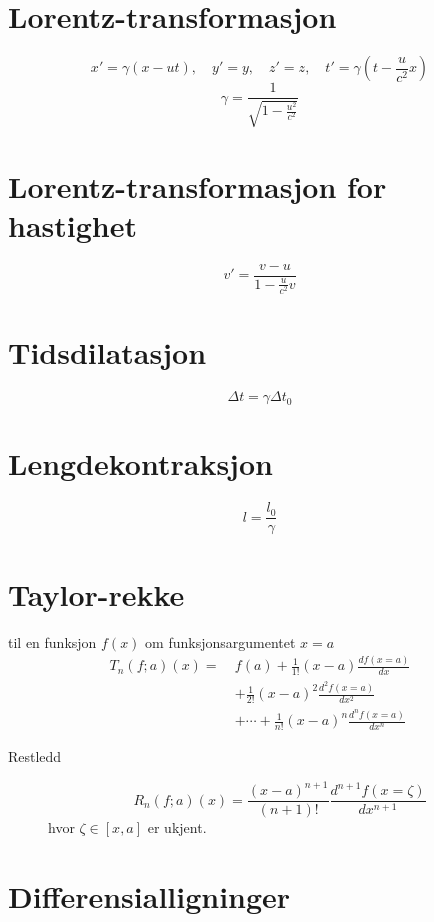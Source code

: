 \documentclass[a4paper,9pt]{extarticle}
\begin{document}
\begin{multicols}{2}
\section*{Lorentz-transformasjon}
\[ x' = \gamma(x - ut), \quad y' = y, \quad z' = z, \quad t' = \gamma\left(t - \frac{u}{c^2}x\right)\]
\[ \gamma = \frac{1}{\sqrt{1 - \frac{u^2}{c^2}}} \]


\section*{Lorentz-transformasjon for hastighet}
\[ v' = \frac{v - u}{1 - \frac{u}{c^2} v} \]


\section*{Tidsdilatasjon}
\[ \Delta t = \gamma \Delta t_0 \]

\section*{Lengdekontraksjon}
\[ l = \frac{l_0}{\gamma} \]


\section*{Taylor-rekke }
til en funksjon $f(x)$ om funksjonsargumentet $x=a$
\begin{equation*}
    \begin{split}
        T_n(f;a)(x) = \ &f(a) + \frac{1}{1!}(x-a)\frac{df(x\!=\!a)}{dx} \\
        &+ \frac{1}{2!}(x-a)^2\frac{d^2f(x\!=\!a)}{dx^2} \\
        & + \cdots + \frac{1}{n!}(x-a)^n\frac{d^nf(x\!=\!a)}{dx^n} 
    \end{split}
\end{equation*}

\begin{description}
\item [Restledd] \[ R_n(f;a)(x) = \frac{(x-a)^{n+1}}{(n+1)!}  \frac{d^{n+1}f(x=\zeta)}{dx^{n+1}}  \] hvor $\zeta \in [x,a] $ er ukjent.
\end{description}



\section*{Differensialligninger}


\end{multicols}
\end{document}
